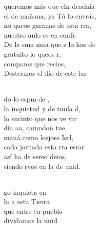 \documentclass[12pt]{article}
\begin{document}
\begin{multicols*}{2}
\begin{cancion}%
	 queremos más que eln deadaía\\
	el de mañana, ya Tú lo envrás,\\
	no queos garanas de esta rra, \\
	nuestro anlo es en confr.\\
\jump
	De la sma maa que s lo has do\\
	gratuito lo queos r,\\
	comparos  que recios,\\
	Destermos el dio de este lar\\\jump\\
	\begin{chorus}%
	do lo espm de ,\\
	la inquietud y de tuula d,\\
	lo sucinto que nos ve vir\\
	día aa, camndon tue. \\
\jump
	 maná como losjose Isrl,\\
	cada jornada esta rra esrar\\
	así ha de sereo deios,\\
	siendo rvos en la de  unid.\\
	\end{chorus}%
	\jump\\
	go inquieta en \\
	la a  esta Tierra\\
que entre tu pueblo \\
	dividamos la unid\\

\end{cancion}
\end{multicols*}
\end{document}

